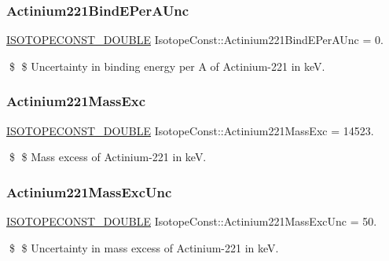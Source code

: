 \subsubsection{\texorpdfstring{Actinium221\+Bind\+E\+Per\+A\+Unc}{Actinium221BindEPerAUnc}}
{\footnotesize\ttfamily \mbox{\hyperlink{group___isotope_const-_macros_ga8f45a7272ce02c0b4c65c44636ed719a}{I\+S\+O\+T\+O\+P\+E\+C\+O\+N\+S\+T\+\_\+\+D\+O\+U\+B\+LE}} Isotope\+Const\+::\+Actinium221\+Bind\+E\+Per\+A\+Unc = 0.}

\$ \$ Uncertainty in binding energy per A of Actinium-\/221 in keV. \mbox{\label{group___isotope_const-_actinium-_ac221_ga279213a4961defac507a4a034115a34d}} 
\subsubsection{\texorpdfstring{Actinium221\+Mass\+Exc}{Actinium221MassExc}}
{\footnotesize\ttfamily \mbox{\hyperlink{group___isotope_const-_macros_ga8f45a7272ce02c0b4c65c44636ed719a}{I\+S\+O\+T\+O\+P\+E\+C\+O\+N\+S\+T\+\_\+\+D\+O\+U\+B\+LE}} Isotope\+Const\+::\+Actinium221\+Mass\+Exc = 14523.}

\$ \$ Mass excess of Actinium-\/221 in keV. \mbox{\label{group___isotope_const-_actinium-_ac221_ga9f8e1ee40e67ba404e666b34762a1f85}} 
\subsubsection{\texorpdfstring{Actinium221\+Mass\+Exc\+Unc}{Actinium221MassExcUnc}}
{\footnotesize\ttfamily \mbox{\hyperlink{group___isotope_const-_macros_ga8f45a7272ce02c0b4c65c44636ed719a}{I\+S\+O\+T\+O\+P\+E\+C\+O\+N\+S\+T\+\_\+\+D\+O\+U\+B\+LE}} Isotope\+Const\+::\+Actinium221\+Mass\+Exc\+Unc = 50.}

\$ \$ Uncertainty in mass excess of Actinium-\/221 in keV. \mbox{\label{group___isotope_const-_actinium-_ac221_gadccdf8b0178f06ce1461b85b93ef373e}} 
